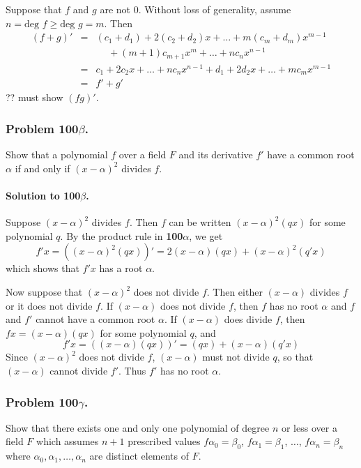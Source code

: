 Suppose that $f$ and $g$ are not $0$. Without loss of generality, assume
$n = \mbox{deg } f \geq \mbox{deg } g = m$. Then
\begin{eqnarray*}
(f+g)' & = & (c_1+d_1) + 2(c_2+d_2)x + \dots + m(c_m+d_m)x^{m-1} \\
& & \hspace{15pt} + (m+1)c_{m+1}x^m + \dots + nc_n x^{n-1} \\
& = & c_1 + 2c_2 x + \dots + nc_n x^{n-1} + d_1 + 2d_2 x + \dots + mc_m x^{m-1} \\
& = & f' + g'
\end{eqnarray*}
?? must show $(fg)'$.

\subsubsection{Problem 100$\beta$.}
Show that a polynomial $f$ over a field $F$ and its derivative $f'$ have a common
root $\alpha$ if and only if $(x-\alpha)^2$ divides $f$.

\paragraph*{Solution to 100$\beta$.}
Suppose $(x-\alpha)^2$ divides $f$. Then $f$ can be written $(x-\alpha)^2(qx)$
for some polynomial $q$. By the product rule in \textbf{100$\alpha$}, we get
$$f'x = ((x-\alpha)^2(qx))' = 2(x-\alpha)(qx) + (x-\alpha)^2(q'x)$$
which shows that $f'x$ has a root $\alpha$.

Now suppose that $(x-\alpha)^2$ does not divide $f$. Then either $(x-\alpha)$
divides $f$ or it does not divide $f$. If $(x-\alpha)$ does not divide $f$, then $f$ has
no root $\alpha$ and $f$ and $f'$ cannot have a common root $\alpha$. If $(x-\alpha)$
does divide $f$, then $fx = (x-\alpha)(qx)$ for some polynomial $q$, and
$$f'x = ((x-\alpha)(qx))' = (qx) + (x-\alpha)(q'x)$$
Since $(x-\alpha)^2$ does not divide $f$, $(x-\alpha)$ must not divide $q$, so
that $(x-\alpha)$ cannot divide $f'$. Thus $f'$ has no root $\alpha$.

\subsubsection{Problem 100$\gamma$.}
Show that there exists one and only one polynomial of degree $n$ or less over a
field $F$ which assumes $n+1$ prescribed values $f\alpha_0 = \beta_0$,
$f\alpha_1 = \beta_1$, $\dots$, $f\alpha_n = \beta_n$ where $\alpha_0, \alpha_1,
\dots , \alpha_n$ are distinct elements of $F$.

